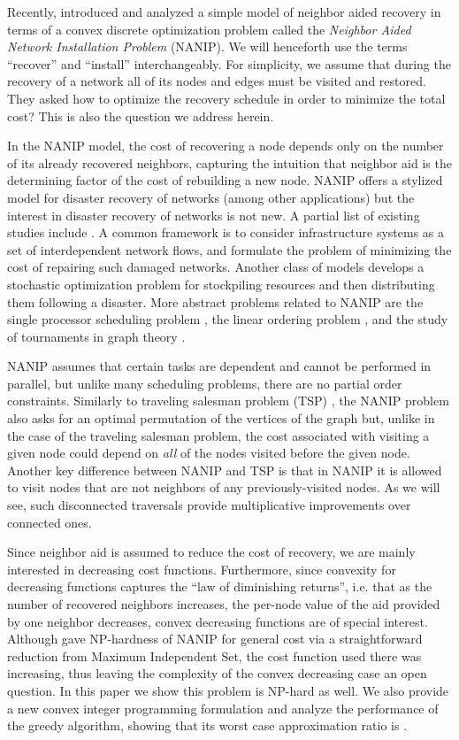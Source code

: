 \documentclass[english]{llncs}
\begin{document}
Recently, \cite{Gutfraind14} introduced and analyzed a simple
model of neighbor aided recovery in terms of a convex discrete optimization
problem called the \emph{Neighbor Aided Network Installation Problem} (NANIP).
We will henceforth use the terms ``recover'' and ``install'' interchangeably.
For simplicity, we assume that during the recovery of a network all of its
nodes and edges must be visited and restored. They asked how to optimize the
recovery schedule in order to minimize the total cost?  This is also the
question we address herein.

In the NANIP model, the cost of recovering a node depends only on the number of
its already recovered neighbors, capturing the intuition that neighbor aid is
the determining factor of the cost of rebuilding a new node.  NANIP offers a
stylized model for disaster recovery of networks (among other applications) but
the interest in disaster recovery of networks is not new.  A partial list of
existing studies include
\cite{Guha99,nurre2010restoring,Lee07,Adibi94,Bertoli02,coffrin2011strategic}.
A common framework is to consider infrastructure systems as a set of
interdependent network flows, and formulate the problem of minimizing the cost
of repairing such damaged networks.  Another class of models
\cite{Hentenryck10} develops a stochastic optimization problem for stockpiling
resources and then distributing them following a disaster.  More abstract
problems related to NANIP are the single processor scheduling problem
\cite{Karp61}, the linear ordering problem \cite{Mitchell96}, and the study of
tournaments in graph theory \cite{West01}.  

NANIP assumes that certain tasks are dependent and cannot be performed in
parallel, but unlike many scheduling problems, there are no partial order
constraints.  Similarly to traveling salesman problem (TSP)
\cite{schrijver2005history}, the NANIP problem also asks for an optimal
permutation of the vertices of the graph but, unlike in the case of the
traveling salesman problem, the cost associated with visiting a given node
could depend on \emph{all} of the nodes visited before the given node. Another
key difference between NANIP and TSP is that in NANIP it is allowed to visit
nodes that are not neighbors of any previously-visited nodes. As we will see,
such disconnected traversals provide  multiplicative
improvements over connected ones.

Since neighbor aid is assumed to reduce the cost of recovery, we are mainly
interested in decreasing cost functions. Furthermore, since convexity for
decreasing functions captures the ``law of diminishing returns'', i.e. that as
the number of recovered neighbors increases, the per-node value of the aid
provided by one neighbor decreases, convex decreasing functions are of special
interest. Although \cite{Gutfraind14}  gave NP-hardness of
NANIP for general cost via a straightforward reduction from Maximum Independent
Set, the cost function used there was increasing, thus leaving the complexity
of the convex decreasing case an open question.  In this paper we show this
problem is NP-hard as well.  We also provide a new convex integer programming
formulation and analyze the performance of the greedy algorithm, showing that
its worst case approximation ratio is .
\end{document}
